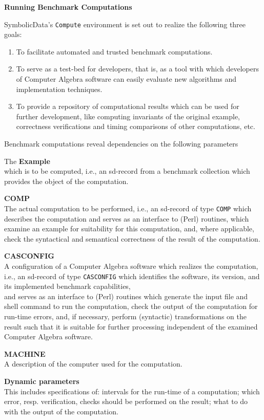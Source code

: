 \documentclass{slides}
\newcommand{\SD}{{\sc Symbolic\-Data}}
\newcommand{\titel}[1]{\begin{center}\large\bf #1\end{center}}
\begin{document}
\titel{Running Benchmark Computations}
\SD's {\tt Compute} environment is set out to realize the following
three goals:
\begin{enumerate}
\item To facilitate automated and trusted benchmark computations.
\item To serve as a test-bed for developers, that is, as a tool with
which developers of Computer Algebra software can easily evaluate new
algorithms and implementation techniques.
\item To provide a repository of computational results which can be
used for further development, like computing invariants of the
original example, correctness verifications and timing comparisons of
other computations, etc.
\end{enumerate}

Benchmark computations reveal dependencies on the following parameters

The {\bf Example}\\ which is to be computed, i.e., an sd-record from a
benchmark collection which provides the object of the computation.

{\bf COMP}\\ The actual computation to be performed, i.e., an
sd-record of type {\tt COMP} which describes the computation and
serves as an interface to (Perl) routines, which examine an example
for suitability for this computation, and, where applicable, check
the syntactical and semantical correctness of the result of the
computation.

{\bf CASCONFIG}\\ A configuration of a Computer Algebra software which
realizes the computation, i.e., an sd-record of type {\tt CASCONFIG}
which identifies the software, its version, and its implemented
benchmark capabilities, \\[12pt]
and serves as an interface to (Perl) routines which generate the input
file and shell command to run the computation, check the output of the
computation for run-time errors, and, if necessary, perform
(syntactic) transformations on the result such that it is suitable for
further processing independent of the examined Computer Algebra
software.

{\bf MACHINE}\\ A description of the computer used for the
computation.

{\bf Dynamic parameters}\\ This includes specifications of: intervals
for the run-time of a computation; which error, resp. verification,
checks should be performed on the result; what to do with the output
of the computation.
\end{document}
